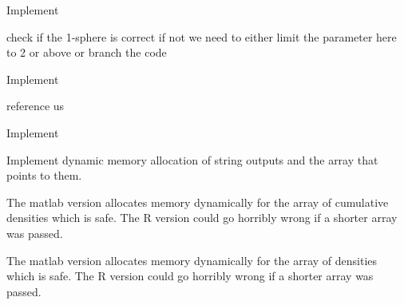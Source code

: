 \begin{DoxyRefList}
\item[\label{todo__todo000012}%
\hypertarget{todo__todo000012}{}%
Global \hyperlink{_hyper_sphere_geodesic_8h_aea738ef87b8748b10e9fd4a505a55c0d}{Hyper\-Sphere\-Geodesic\-Distance\-C\-D\-F} (double t, double $\ast$parameters)]Implement  
\item[\label{todo__todo000015}%
\hypertarget{todo__todo000015}{}%
Global \hyperlink{_hyper_sphere_geodesic_8h_a0d1f54ac3a880c1c99d1ca5e85bd8256}{Hyper\-Sphere\-Geodesic\-Distance\-Check\-Parameters} (double $\ast$parameters, int $\ast$result, char $\ast$error\-\_\-str)]check if the 1-\/sphere is correct if not we need to either limit the parameter here to 2 or above or branch the code  
\item[\label{todo__todo000013}%
\hypertarget{todo__todo000013}{}%
Global \hyperlink{_hyper_sphere_geodesic_8h_ace4934a0a477c12fee4f0fccea40c50a}{Hyper\-Sphere\-Geodesic\-Distance\-Mean} (double $\ast$parameters)]Implement  
\item[\label{todo__todo000011}%
\hypertarget{todo__todo000011}{}%
Global \hyperlink{_hyper_sphere_geodesic_8h_a16d98ff2d1ad0e4d662b8631c72f9931}{Hyper\-Sphere\-Geodesic\-Distance\-P\-D\-F} (double t, double $\ast$parameters)]reference us  
\item[\label{todo__todo000014}%
\hypertarget{todo__todo000014}{}%
Global \hyperlink{_hyper_sphere_geodesic_8h_a203990a77a11670e5ab591d64461fca4}{Hyper\-Sphere\-Geodesic\-Distance\-Var} (double $\ast$parameters)]Implement  
\item[\label{todo__todo000019}%
\hypertarget{todo__todo000019}{}%
Global \hyperlink{group__api_gaf04b41252ebd1a3013b6bcb4dbbf3649}{Line\-Picking\-All\-Problems} (char $\ast$$\ast$, char $\ast$$\ast$)]Implement dynamic memory allocation of string outputs and the array that points to them.  
\item[\label{todo__todo000022}%
\hypertarget{todo__todo000022}{}%
Global \hyperlink{group__api_ga445ba2c007d60d789747cecbd5f874b9}{Line\-Picking\-C\-D\-F} (double $\ast$, double $\ast$, int $\ast$, int $\ast$, double $\ast$, int $\ast$, int $\ast$, char $\ast$$\ast$)]The matlab version allocates memory dynamically for the array of cumulative densities which is safe. The R version could go horribly wrong if a shorter array was passed.  
\item[\label{todo__todo000021}%
\hypertarget{todo__todo000021}{}%
Global \hyperlink{group__api_ga8feba9835984bd74f3d919f51389e573}{Line\-Picking\-P\-D\-F} (double $\ast$, double $\ast$, int $\ast$, int $\ast$, double $\ast$, int $\ast$, int $\ast$, char $\ast$$\ast$)]The matlab version allocates memory dynamically for the array of densities which is safe. The R version could go horribly wrong if a shorter array was passed.  

\end{DoxyRefList}

